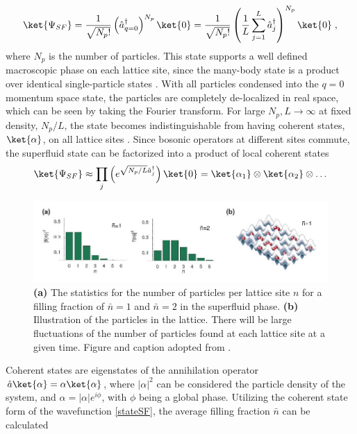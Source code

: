 \begin{equation}
	\ket{\Psi_{SF}} =  \frac{1}{\sqrt{N_{p} !}} \left( \hat{a}_{q = 0}^{\dag} \right) ^{N_{p}} \ket{0} = \frac{1}{\sqrt{N_{p} !}} \left( \frac{1}{L} \sum_{j = 1}^{L} \hat{a}_{j}^{\dag} \right) ^{N_{p}} \ket{0} \; ,
\end{equation} 
where $N_{p}$ is the number of particles. This state supports a well defined macroscopic phase on each lattice site, since the many-body state is a product over identical single-particle states \cite{greiner}. With all particles condensed into the $q = 0$ momentum space state, the particles are completely de-localized in real space, which can be seen by taking the Fourier transform. For large $N_{p} , L \rightarrow \infty$ at fixed density, $N_{p}/L$, the state becomes indistinguishable from having coherent states, $\ket{\alpha} $, on all lattice sites \cite{manybodyBloch}. Since bosonic operators at different sites commute, the superfluid state can be factorized into a product of local coherent states
\begin{equation}
	\ket{\Psi_{SF}} \approx \prod_j \left( e^{\sqrt{N_p/L} \hat{a}_{j}^{\dag}} \right) \ket{0} = \ket{\alpha_1} \otimes \ket{\alpha_2} \otimes \ldots
	\label{stateSF}
\end{equation}
\begin{figure}[!h]
	\centering
	\includegraphics[width=0.8\columnwidth]{Figures/f(n)_SF.JPG} 
	\caption{\textbf{(a)} The statistics for the number of particles per lattice site $n$ for a filling fraction of $\bar{n}=1$ and $\bar{n}=2$ in the superfluid phase. \textbf{(b)} Illustration of the particles in the lattice. There will be large fluctuations of the number of particles found at each lattice site at a given time. Figure and caption adopted from \cite{greiner}.}
	\label{fig:f(n)_SF} 
\end{figure}
Coherent states are eigenstates of the annihilation operator $\hat{a} \ket{\alpha} = \alpha \ket{\alpha}$, where $|\alpha |^2$ can be considered the particle density of the system, and $\alpha = |\alpha| e^{i \phi}$, with $\phi$ being a global phase. Utilizing the coherent state form of the wavefunction \eqref{stateSF}, the average filling fraction $\bar{n}$ can be calculated

